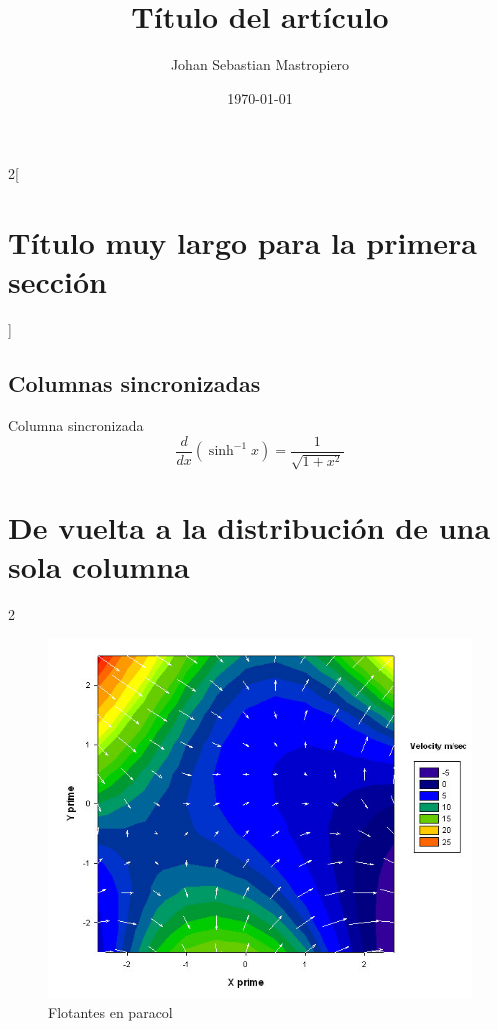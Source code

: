 \documentclass{article}
\title{Título del artículo}
\author{Johan Sebastian Mastropiero}
\date{\today}
\begin{document}
	\maketitle
	\begin{abstract}
		\lipsum[1]
	\end{abstract}

	\begin{paracol}{2}[\section{Título muy largo para la primera sección}]
		\subsection{Columnas sincronizadas}
		\lipsum[3]
		\switchcolumn %
		\lipsum[2]
		\switchcolumn* %
		Columna sincronizada
		\[
			\frac{d}{dx}(\sinh ^{-1}x) = \frac{1}{\sqrt{1 + x^2}}
		\]
		\switchcolumn
		\lipsum[2]
		\switchcolumn*
		\lipsum[1]
		\switchcolumn
		\lipsum[2]
	\end{paracol}

	\section{De vuelta a la distribución de una sola columna}
		\lipsum[7-8]
		\begin{paracol}{2}
			\lipsum[5]
			\switchcolumn
			\begin{figure}[ht] %
				\centering
				\includegraphics[scale=.35]{2Dvectorplot.jpg}
				\caption{Flotantes en paracol}
			\end{figure}
		\end{paracol}
\end{document}
